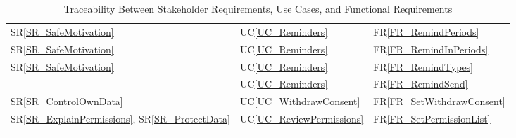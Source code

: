 \documentclass[12pt]{article}
\newcommand{\srref}[1]{SR\ref{#1}}
\newcommand{\ucref}[1]{UC\ref{#1}}
\newcommand{\rref}[1]{FR\ref{#1}}
\begin{document}
\begin{longtable}{p{} p{} p{}}
\srref{SR_SafeMotivation} & \ucref{UC_Reminders} & \rref{FR_RemindPeriods} \\
\srref{SR_SafeMotivation} & \ucref{UC_Reminders} & \rref{FR_RemindInPeriods} \\
\srref{SR_SafeMotivation} & \ucref{UC_Reminders} & \rref{FR_RemindTypes} \\
-- & \ucref{UC_Reminders} & \rref{FR_RemindSend} \\
\srref{SR_ControlOwnData} & \ucref{UC_WithdrawConsent} & \rref{FR_SetWithdrawConsent} \\
\srref{SR_ExplainPermissions}, \srref{SR_ProtectData} & \ucref{UC_ReviewPermissions} & \rref{FR_SetPermissionList} \\
\bottomrule

\caption{Traceability Between Stakeholder Requirements, Use Cases, and
Functional Requirements} \label{tab:SR2UC2FRtm}
\end{longtable}
\end{document}
